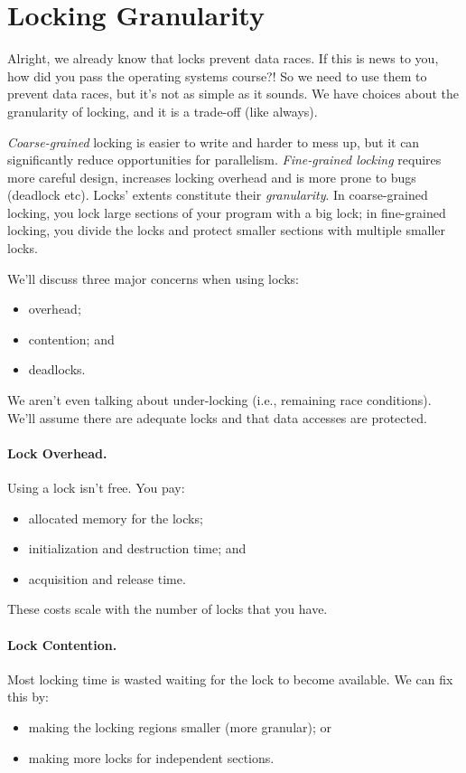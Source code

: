 \documentclass[a4paper]{report}
\begin{document}
\section*{Locking Granularity}

Alright, we already know that locks prevent data races. If this is news to you, how did you pass the operating systems course?! So we need to use them to prevent data races, but it's not as simple as it sounds. We have choices about the granularity of locking, and it is a trade-off (like always).

\textit{Coarse-grained} locking is easier to write and harder to mess up, but it can significantly reduce opportunities for parallelism. \textit{
Fine-grained locking} requires more careful design,
increases locking overhead and is more prone to bugs (deadlock etc).  
Locks' extents constitute their {\it granularity}. In coarse-grained locking, you
lock large sections of your program with a big lock; in fine-grained
locking, you divide the locks and protect smaller sections with multiple smaller locks.

We'll discuss three major concerns when using locks:
  \begin{itemize}
    \item overhead;
    \item contention; and
    \item deadlocks.
  \end{itemize}
We aren't even talking about under-locking (i.e., remaining race conditions). We'll assume there are adequate locks and that data accesses are protected. 

\paragraph{Lock Overhead.}
  Using a lock isn't free. You pay:
  \begin{itemize}
    \item allocated memory for the locks;
    \item initialization and destruction time; and
    \item acquisition and release time.
  \end{itemize}
  These costs scale with the number of locks that you have.

\paragraph{Lock Contention.}
 Most locking time is wasted waiting for the lock to become available.
We can fix this by:
      \begin{itemize}
        \item making the locking regions smaller (more granular); or
        \item making more locks for independent sections.
      \end{itemize}
\end{document}
